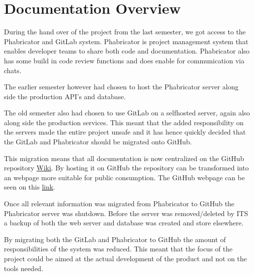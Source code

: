 \section{Documentation Overview}\label{SEC:DocumentationOverview}
During the hand over of the project from the last semester, we got access to the Phabricator and GitLab system. 
Phabricator is project management system that enables developer teams to share both code and documentation. 
Phabricator also has some build in code review functions and does enable for communication via chats. 

The earlier semester however had chosen to host the Phabricator server along side the production API's and database.

The old semester also had chosen to use GitLab on a selfhosted server, again also along side the production services. 
This meant that the added responsibility on the servers made the entire project unsafe and it has hence quickly decided that the GitLab and Phabricator should be migrated onto GitHub. 

This migration means that all documentation is now centralized on the GitHub repository \href{https://github.com/aau-giraf/wiki}{Wiki}. 
By hosting it on GitHub the repository can be transformed into an webpage more suitable for public consumption.
The GitHub webpage can be seen on this \href{https://aau-giraf.github.io/wiki/}{link}.

Once all relevant information was migrated from Phabricator to GitHub the Phabricator server was shutdown. 
Before the server was removed/deleted by ITS a backup of both the web server and database was created and store elsewhere.

By migrating both the GitLab and Phabricator to GitHub the amount of responsibilities of the system was reduced. 
This meant that the focus of the project could be aimed at the actual development of the product and not on the tools needed.